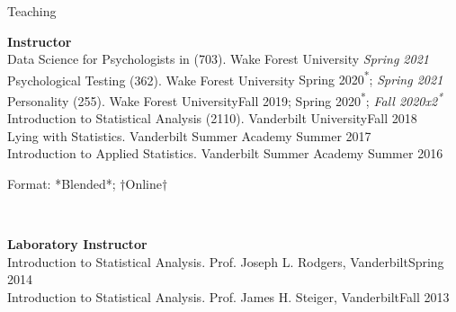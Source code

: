 \begin{rSection}{\textrm{Teaching}}
\vspace*{2pt}
\begin{minipage}{\linewidth}{\large {\bf Instructor}\\}
Data Science for Psychologists in \R (703). Wake Forest University \hfill {\textit{Spring 2021}}\smallskip\\
Psychological Testing  (362). Wake Forest University \hfill {Spring 2020\textsuperscript{*}; \textit{Spring 2021}}\smallskip\\%
Personality (255). Wake Forest University\hfill{Fall 2019; Spring 2020\textsuperscript{*}; \textit{Fall 2020x2\textsuperscript{*}\notbns}}\smallskip\\
Introduction to Statistical Analysis (2110). Vanderbilt University\hfill {Fall 2018}\smallskip\\
Lying with Statistics. Vanderbilt Summer Academy \hfill{Summer 2017}\smallskip\\
Introduction to Applied Statistics. Vanderbilt Summer Academy \hfill{Summer 2016}%
\end{minipage}
\vspace{-1mm}\begin{center}\footnotesize{Format: *Blended*; $\dagger$Online$\dagger$}\end{center} \vspace{-3mm}
\smallskip\\
\begin{minipage}{\linewidth}{\large {\bf Laboratory Instructor}\\}
Introduction to Statistical Analysis. Prof. Joseph L. Rodgers, Vanderbilt\hfill  {Spring 2014}%
\smallskip\\
Introduction to Statistical Analysis. Prof. James H. Steiger, Vanderbilt\hfill  {Fall 2013}%

\end{minipage}
\end{rSection}
